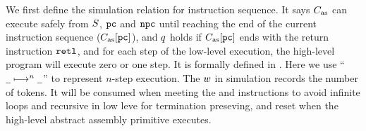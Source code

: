We first define the simulation relation for
instruction sequence.
It says $C_{\text{as}}$ can execute safely
from $S$, $\texttt{pc}$ and $\texttt{npc}$ until reaching
the end of the current instruction sequence ($C_{\text{as}}[\texttt{pc}]$),
and $q$ holds if $C_{\text{as}}[\texttt{pc}]$ ends with the return
instruction $\texttt{retl}{}$, and for each step of the low-level
execution, the high-level program will execute zero or
one step.
It is formally defined in \Def{\ref{def:siminsseq}}.
Here we use ``$\underline{\ \,} \longmapsto^{n} \underline{\ \,}$'' to
represent $n$-step execution.
The $w$ in simulation records the number of tokens.
It will be consumed when meeting the \jmp{} and \call{}
instructions to avoid infinite loops and recursive in 
low leve for termination preseving, and reset 
when the high-level abstract assembly primitive executes.

